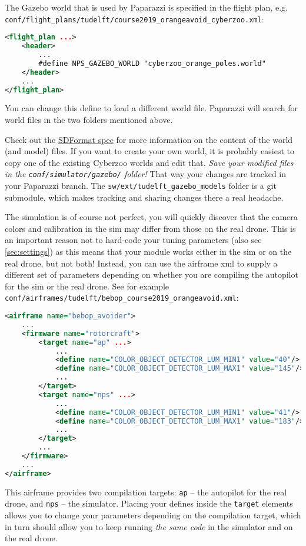 \documentclass{article}
\begin{document}
The Gazebo world that is used by Paparazzi is specified in the flight plan, e.g. \\\texttt{conf/flight\_plans/tudelft/course2019\_orangeavoid\_cyberzoo.xml}:
\begin{lstlisting}[language=xml]
<flight_plan ...>
	<header>
		...
		#define NPS_GAZEBO_WORLD "cyberzoo_orange_poles.world"
	</header>
	...
</flight_plan>
\end{lstlisting}
You can change this define to load a different world file. Paparazzi will search for world files in the two folders mentioned above.

Check out the \href{http://sdformat.org/spec?ver=1.6&elem=world}{SDFormat spec} for more information on the content of the world (and model) files.
If you want to create your own world, it is probably easiest to copy one of the existing Cyberzoo worlds and edit that. \emph{Save your modified files in the \texttt{conf/simulator/gazebo/} folder!} That way your changes are tracked in your Paparazzi branch. The \texttt{sw/ext/tudelft\_gazebo\_models} folder is a git submodule, which makes tracking and sharing changes there a real headache.

The simulation is of course not perfect, you will quickly discover that the camera colors and calibration in the sim may differ from those on the real drone. This is an important reason not to hard-code your tuning parameters (also see \autoref{sec:settings}) as this means that your module works either in the sim or on the real drone, but not both! Instead, you can use the airframe xml to supply a different set of parameters depending on whether you are compiling the autopilot for the sim or the real drone. See for example \texttt{conf/airframes/tudelft/bebop\_course2019\_orangeavoid.xml}:
\begin{lstlisting}[language=xml]
<airframe name="bebop_avoider">
	...
	<firmware name="rotorcraft">
		<target name="ap" ...>
			...
			<define name="COLOR_OBJECT_DETECTOR_LUM_MIN1" value="40"/>
			<define name="COLOR_OBJECT_DETECTOR_LUM_MAX1" value="145"/>
			...
		</target>
		<target name="nps" ...>
			...
			<define name="COLOR_OBJECT_DETECTOR_LUM_MIN1" value="41"/>
			<define name="COLOR_OBJECT_DETECTOR_LUM_MAX1" value="183"/>
			...
		</target>
		...
	</firmware>
	...
</airframe>
\end{lstlisting}
This airframe provides two compilation targets: \texttt{ap} -- the autopilot for the real drone, and \texttt{nps} -- the simulator. Placing your defines inside the \texttt{target} elements allows you to change your parameters depending on the compilation target, which in turn should allow you to keep running \emph{the same code} in the simulator and on the real drone.
\end{document}
